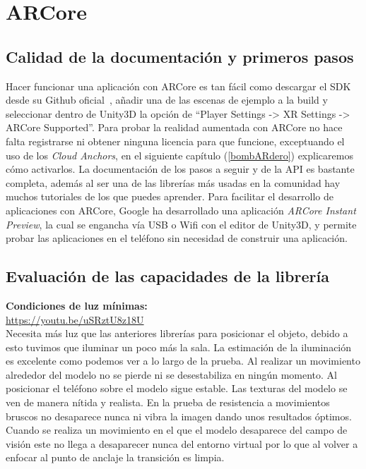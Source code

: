 \newpage
\section{ARCore}
\subsection{Calidad de la documentación y primeros pasos}
Hacer funcionar una aplicación con ARCore es tan fácil como descargar el SDK desde su Github oficial~\cite{Github_Google}, añadir una de las escenas de ejemplo a la build y seleccionar dentro de Unity3D la opción de ``Player Settings -> XR Settings -> ARCore Supported''. Para probar la realidad aumentada con ARCore no hace falta registrarse ni obtener ninguna licencia para que funcione, exceptuando el uso de los \textit{Cloud Anchors}, en el siguiente capítulo (\ref{bombARdero}) explicaremos cómo activarlos. La documentación de los pasos a seguir y de la API es bastante completa, además al ser una de las librerías más usadas en la comunidad hay muchos tutoriales de los que puedes aprender. Para facilitar el desarrollo de aplicaciones con ARCore, Google ha desarrollado una aplicación \textit{ARCore Instant Preview}, la cual se engancha vía USB o Wifi con el editor de Unity3D, y permite probar las aplicaciones en el teléfono sin necesidad de construir una aplicación.
\subsection{Evaluación de las capacidades de la librería}
\textbf{Condiciones de luz mínimas:}\\
\url{https://youtu.be/uSRztU8z18U}\\

Necesita más luz que las anteriores librerías para posicionar el objeto, debido a esto tuvimos que iluminar un poco más la sala. La estimación de la iluminación es excelente como podemos ver a lo largo de la prueba. Al realizar un movimiento alrededor del modelo no se pierde ni se desestabiliza en ningún momento. Al posicionar el teléfono sobre el modelo sigue estable. Las texturas del modelo se ven de manera nítida y realista. En la prueba de resistencia a movimientos bruscos no desaparece nunca ni vibra la imagen dando unos resultados óptimos. Cuando se realiza un movimiento en el que el modelo desaparece del campo de visión este no llega a desaparecer nunca del entorno virtual por lo que al volver a enfocar al punto de anclaje la transición es limpia.\\

